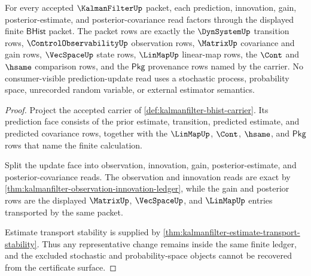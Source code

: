 \begin{theorem}
\label{thm:kalmanfilter-prediction-update-ledger-exactness}
For every accepted $\KalmanFilterUp$ packet, each prediction, innovation, gain, posterior-estimate, and posterior-covariance read factors through the displayed finite $\mathsf{BHist}$ packet. The packet rows are exactly the $\DynSystemUp$ transition rows, $\ControlObservabilityUp$ observation rows, $\MatrixUp$ covariance and gain rows, $\VecSpaceUp$ state rows, $\LinMapUp$ linear-map rows, the $\Cont$ and $\hsame$ comparison rows, and the $\mathsf{Pkg}$ provenance rows named by the carrier. No consumer-visible prediction-update read uses a stochastic process, probability space, unrecorded random variable, or external estimator semantics.
\end{theorem}
\begin{proof}
Project the accepted carrier of \autoref{def:kalmanfilter-bhist-carrier}. Its prediction face consists of the prior estimate, transition, predicted estimate, and predicted covariance rows, together with the $\LinMapUp$, $\Cont$, $\hsame$, and $\mathsf{Pkg}$ rows that name the finite calculation.

Split the update face into observation, innovation, gain, posterior-estimate, and posterior-covariance reads. The observation and innovation reads are exact by \autoref{thm:kalmanfilter-observation-innovation-ledger}, while the gain and posterior rows are the displayed $\MatrixUp$, $\VecSpaceUp$, and $\LinMapUp$ entries transported by the same packet.

Estimate transport stability is supplied by \autoref{thm:kalmanfilter-estimate-transport-stability}. Thus any representative change remains inside the same finite ledger, and the excluded stochastic and probability-space objects cannot be recovered from the certificate surface.
\end{proof}

